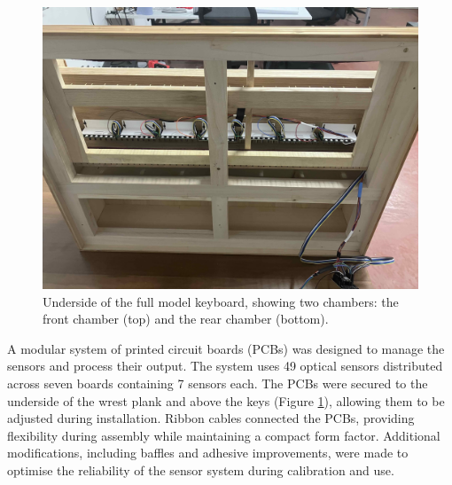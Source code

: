 
\begin{figure}
  \centering
  \includegraphics[width=\linewidth]{src/images/49-key-bottom-sensors-no-keys.jpg} 
  \caption{Underside of the full model keyboard, showing two chambers: the front chamber (top) and the rear chamber (bottom).} 
  \label{fig:49-key-bottom}
\end{figure}

A modular system of printed circuit boards (PCBs) was designed to manage the sensors and process their output. The system uses 49 optical sensors distributed across seven boards containing 7 sensors each. The PCBs were secured to the underside of the wrest plank and above the keys (Figure \ref{fig:49-key-bottom}), allowing them to be adjusted during installation. Ribbon cables connected the PCBs, providing flexibility during assembly while maintaining a compact form factor. Additional modifications, including baffles and adhesive improvements, were made to optimise the reliability of the sensor system during calibration and use.

